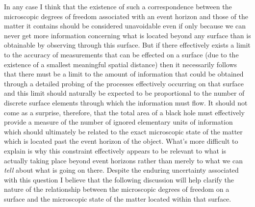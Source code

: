 \documentclass[notitlepage,12pt]{report}
\begin{document}
In any case I think that the existence of such a correspondence between the microscopic degrees of freedom associated with an event horizon and those of the matter it contains should be considered unavoidable even if only because we can never get more information concerning what is located beyond any surface than is obtainable by observing through this surface. But if there effectively exists a limit to the accuracy of measurements that can be effected on a surface (due to the existence of a smallest meaningful spatial distance) then it necessarily follows that there must be a limit to the amount of information that could be obtained through a detailed probing of the processes effectively occurring on that surface and this limit should naturally be expected to be proportional to the number of discrete surface elements through which the information must flow. It should not come as a surprise, therefore, that the total area of a black hole must effectively provide a measure of the number of ignored elementary units of information which should ultimately be related to the exact microscopic state of the matter which is located past the event horizon of the object. What's more difficult to explain is why this constraint effectively appears to be relevant to what is actually taking place beyond event horizons rather than merely to what we can \textit{tell} about what is going on there. Despite the enduring uncertainty associated with this question I believe that the following discussion will help clarify the nature of the relationship between the microscopic degrees of freedom on a surface and the microscopic state of the matter located within that surface.

\bigskip
\end{document}
